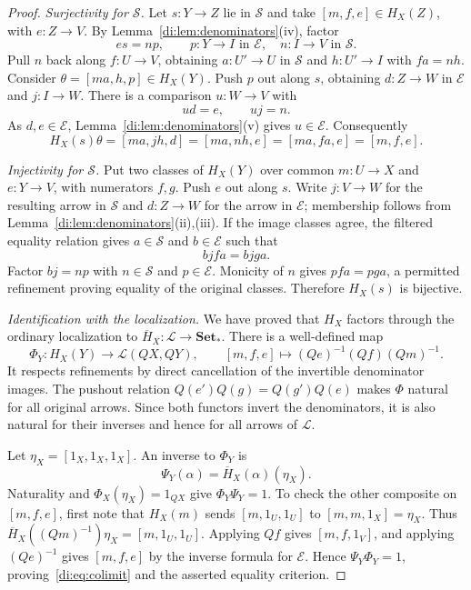 \documentclass[11pt,reqno,a4paper]{amsart}
\theoremstyle{definition}
\theoremstyle{remark}
\newcommand{\0}{\mathbf{0}}
\renewcommand{\1}{\mathbf{1}}
\newcommand{\Sden}{\mathcal S}
\newcommand{\Eden}{\mathcal E}
\newcommand{\Loc}{\mathcal L}
\begin{document}
\begin{proof}
\smallskip\noindent\emph{Surjectivity for $\Sden$.}
Let $s:Y\to Z$ lie in $\Sden$ and take $[m,f,e]\in H_X(Z)$, with $e:Z\to V$. By Lemma~\ref{di:lem:denominators}(iv), factor
\[
 es=np,\qquad p:Y\to I\text{ in }\Eden,
 \quad n:I\to V\text{ in }\Sden.
\]
Pull $n$ back along $f:U\to V$, obtaining $a:U'\to U$ in $\Sden$ and $h:U'\to I$ with $fa=nh$. Consider $\theta=[ma,h,p]\in H_X(Y)$. Push $p$ out along $s$, obtaining $d:Z\to W$ in $\Eden$ and $j:I\to W$. There is a comparison $u:W\to V$ with
\[
 ud=e,\qquad uj=n.
\]
As $d,e\in\Eden$, Lemma~\ref{di:lem:denominators}(v) gives $u\in\Eden$. Consequently
\[
 H_X(s)\theta=[ma,jh,d]=[ma,nh,e]=[ma,fa,e]=[m,f,e].
\]

\smallskip\noindent\emph{Injectivity for $\Sden$.}
Put two classes of $H_X(Y)$ over common $m:U\to X$ and $e:Y\to V$, with numerators $f,g$. Push $e$ out along $s$. Write $j:V\to W$ for the resulting arrow in $\Sden$ and $d:Z\to W$ for the arrow in $\Eden$; membership follows from Lemma~\ref{di:lem:denominators}(ii),(iii). If the image classes agree, the filtered equality relation gives $a\in\Sden$ and $b\in\Eden$ such that
\[
 bjfa=bjga.
\]
Factor $bj=np$ with $n\in\Sden$ and $p\in\Eden$. Monicity of $n$ gives $pfa=pga$, a permitted refinement proving equality of the original classes. Therefore $H_X(s)$ is bijective.

\smallskip\noindent\emph{Identification with the localization.}
We have proved that $H_X$ factors through the ordinary localization to $\overline H_X:\Loc\to\mathbf{Set}_*$. There is a well-defined map
\[
 \Phi_Y:H_X(Y)\longrightarrow\Loc(QX,QY),\qquad
 [m,f,e]\longmapsto(Qe)^{-1}(Qf)(Qm)^{-1}.
\]
It respects refinements by direct cancellation of the invertible denominator images. The pushout relation $Q(e')Q(g)=Q(g')Q(e)$ makes $\Phi$ natural for all original arrows. Since both functors invert the denominators, it is also natural for their inverses and hence for all arrows of $\Loc$.

Let $\eta_X=[1_X,1_X,1_X]$. An inverse to $\Phi_Y$ is
\[
 \Psi_Y(\alpha)=\overline H_X(\alpha)(\eta_X).
\]
Naturality and $\Phi_X(\eta_X)=1_{QX}$ give $\Phi_Y\Psi_Y=1$. To check the other composite on $[m,f,e]$, first note that $H_X(m)$ sends $[m,1_U,1_U]$ to $[m,m,1_X]=\eta_X$. Thus $\overline H_X((Qm)^{-1})\eta_X=[m,1_U,1_U]$. Applying $Qf$ gives $[m,f,1_V]$, and applying $(Qe)^{-1}$ gives $[m,f,e]$ by the inverse formula for $\Eden$. Hence $\Psi_Y\Phi_Y=1$, proving~\eqref{di:eq:colimit} and the asserted equality criterion.
\end{proof}
\end{document}
